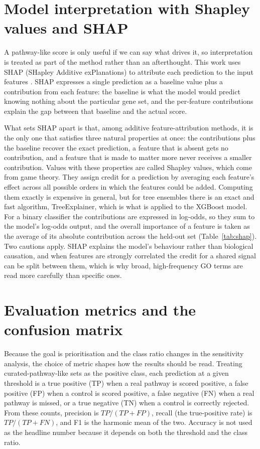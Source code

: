 \documentclass[12pt,letterpaper,oneside,openany]{book}
\begin{document}
\section{Model interpretation with Shapley values and SHAP}
\label{sec:methods_shap_background}

A pathway-like score is only useful if we can say what drives it, so interpretation is treated as part of the method rather than an afterthought. This work uses SHAP (SHapley Additive exPlanations) to attribute each prediction to the input features \citep{lundberg2017unified}. SHAP expresses a single prediction as a baseline value plus a contribution from each feature: the baseline is what the model would predict knowing nothing about the particular gene set, and the per-feature contributions explain the gap between that baseline and the actual score.

What sets SHAP apart is that, among additive feature-attribution methods, it is the only one that satisfies three natural properties at once: the contributions plus the baseline recover the exact prediction, a feature that is absent gets no contribution, and a feature that is made to matter more never receives a smaller contribution. Values with these properties are called Shapley values, which come from game theory. They assign credit for a prediction by averaging each feature's effect across all possible orders in which the features could be added. Computing them exactly is expensive in general, but for tree ensembles there is an exact and fast algorithm, TreeExplainer, which is what is applied to the XGBoost model. For a binary classifier the contributions are expressed in log-odds, so they sum to the model's log-odds output, and the overall importance of a feature is taken as the average of its absolute contribution across the held-out set (Table~\ref{tab:shap}). Two cautions apply. SHAP explains the model's behaviour rather than biological causation, and when features are strongly correlated the credit for a shared signal can be split between them, which is why broad, high-frequency GO terms are read more carefully than specific ones.

\section{Evaluation metrics and the confusion matrix}
\label{sec:methods_metrics}

Because the goal is prioritisation and the class ratio changes in the sensitivity analysis, the choice of metric shapes how the results should be read. Treating curated-pathway-like sets as the positive class, each prediction at a given threshold is a true positive (TP) when a real pathway is scored positive, a false positive (FP) when a control is scored positive, a false negative (FN) when a real pathway is missed, or a true negative (TN) when a control is correctly rejected. From these counts, precision is $TP/(TP+FP)$, recall (the true-positive rate) is $TP/(TP+FN)$, and F1 is the harmonic mean of the two. Accuracy is not used as the headline number because it depends on both the threshold and the class ratio.
\end{document}
